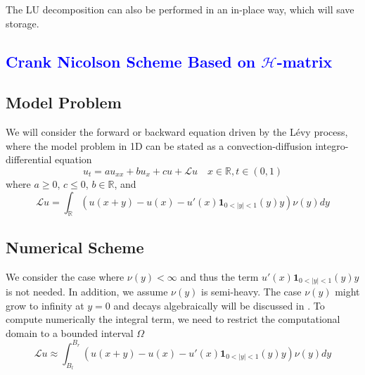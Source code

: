 \documentclass[3p,,preprint,12pt]{elsarticle}
\newcommand{\RR}[0]{\mathbb{R}}
\newcommand{\lib}[1]{\textcolor{blue}{\section{#1}}}
\theoremstyle{definition}
\begin{document}
The LU decomposition can also be performed in an in-place way, which will save storage. 

 
\lib{Crank Nicolson Scheme Based on $\mathcal{H}$-matrix} 
 
 
 \subsection{Model Problem}
 We will consider the forward or backward equation driven by the L\'evy process, where the model problem in 1D can be stated as a convection-diffusion integro-differential equation~\cite{MichaelC25:online}
\begin{equation}\label{equ:ut}
	u_t = a u_{xx} + bu_x + cu + \mathcal{L}u\quad x\in \RR, t\in (0,1)
\end{equation}
where $a\geq 0$, $c\leq 0$, $b\in\RR$, and
\begin{equation}
	\mathcal{L}u = \int_\RR (u(x+y)-u(x)-u'(x)\mathbf{1}_{0<|y|<1}(y)y)\nu(y)dy
\end{equation}  


 \subsection{Numerical Scheme}

We consider the case where $\nu(y)<\infty$ and thus the term $u'(x)\mathbf{1}_{0<|y|<1}(y)y$ is not needed. In addition, we assume $\nu(y)$ is semi-heavy.   The case $\nu(y)$ might grow to infinity at $y=0$ and decays algebraically will be discussed in . To compute numerically the integral term, we need to restrict the computational domain to a bounded interval $\Omega$
\begin{equation}
	\mathcal{L}u \approx \int_{B_l}^{B_r} (u(x+y)-u(x)-u'(x)\mathbf{1}_{0<|y|<1}(y)y)\nu(y)dy
\end{equation}
\end{document}
